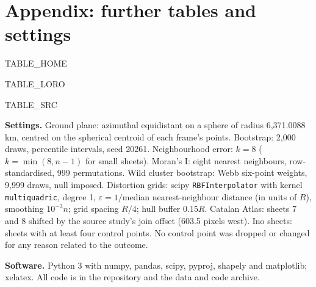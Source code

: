 \documentclass[11pt,a4paper]{article}
\begin{document}
\appendix
\section{Appendix: further tables and settings}
{{TABLE_HOME}}

{{TABLE_LORO}}

{{TABLE_SRC}}

\textbf{Settings.} Ground plane: azimuthal equidistant on a sphere of radius 6,371.0088 km, centred on the spherical centroid of each frame's points. Bootstrap: 2,000 draws, percentile intervals, seed 20261. Neighbourhood error: $k = 8$ ($k = \min(8, n-1)$ for small sheets). Moran's I: eight nearest neighbours, row-standardised, 999 permutations. Wild cluster bootstrap: Webb six-point weights, 9,999 draws, null imposed. Distortion grids: scipy \texttt{RBFInterpolator} with kernel \texttt{multiquadric}, degree 1, $\varepsilon = 1/$median nearest-neighbour distance (in units of $R$), smoothing $10^{-3} n$; grid spacing $R/4$; hull buffer $0.15R$. Catalan Atlas: sheets 7 and 8 shifted by the source study's join offset (603.5 pixels west). Ino sheets: sheets with at least four control points. No control point was dropped or changed for any reason related to the outcome.

\textbf{Software.} Python 3 with numpy, pandas, scipy, pyproj, shapely and matplotlib; xelatex. All code is in the repository and the data and code archive.
\end{document}
